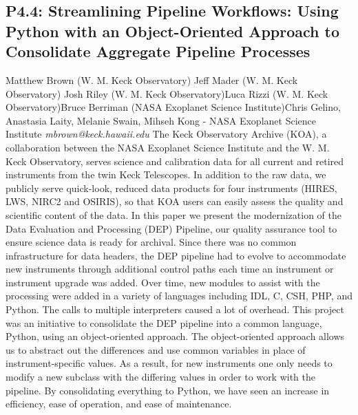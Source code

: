 \documentclass{report}
\begin{document}
\subsection*{P4.4: Streamlining Pipeline Workflows: Using Python with an Object-Oriented Approach to Consolidate Aggregate Pipeline Processes}
\bigskip
Matthew Brown (W. M. Keck Observatory) \newline Jeff Mader (W. M. Keck Observatory) \newline  Josh Riley (W. M. Keck Observatory)\newline  Luca Rizzi (W. M. Keck Observatory)\newline Bruce Berriman (NASA Exoplanet Science Institute)\newline  Chris Gelino, Anastasia Laity, Melanie Swain, Mihseh Kong - NASA Exoplanet Science Institute\newline\newline
{\it mbrown@keck.hawaii.edu}\newline
\newline\newline
The Keck Observatory Archive (KOA), a collaboration between the NASA Exoplanet Science Institute and the W. M. Keck Observatory, serves science and calibration data for all current and retired instruments from the twin Keck Telescopes.  In addition to the raw data, we publicly serve quick-look, reduced data products for four instruments (HIRES, LWS, NIRC2 and OSIRIS), so that KOA users can easily assess the quality and scientific content of the data.  In this paper we present the modernization of the Data Evaluation and Processing (DEP) Pipeline, our quality assurance tool to ensure science data is ready for archival.  Since there was no common infrastructure for data headers, the DEP pipeline had to evolve to accommodate new instruments through additional control paths each time an instrument or instrument upgrade was added. Over time, new modules to assist with the processing were added in a variety of languages including IDL, C, CSH, PHP, and Python.  The calls to multiple interpreters caused a lot of overhead. This project was an initiative to consolidate the DEP pipeline into a common language, Python, using an object-oriented approach. The object-oriented approach allows us to abstract out the differences and use common variables in place of instrument-specific values. As a result, for new instruments one only needs to modify a new subclass with the differing values in order to work with the pipeline. By consolidating everything to Python, we have seen an increase in efficiency, ease of operation, and ease of maintenance.\newline
\newpage
\end{document}
